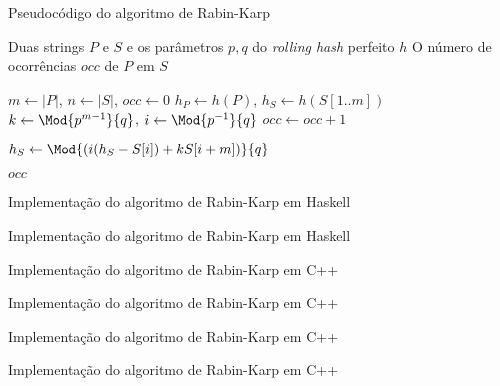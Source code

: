\begin{frame}[fragile]{Pseudocódigo do algoritmo de Rabin-Karp}

    \begin{algorithm}[H]
        \caption{Algoritmo de Rabin-Karp com \textit{hash} perfeito}
        \begin{algorithmic}[1]
            \Require Duas strings $P$ e $S$ e os parâmetros $p, q$ do \textit{rolling hash} perfeito $h$
            \Ensure O número de ocorrências $occ$ de $P$ em $S$

                \State $m \gets |P|$, $n \gets |S|$, $occ \gets 0$
                \State $h_P \gets h(P)$, $h_S \gets h(S[1..m])$
                \State $k \gets \Mod{p^{m - 1}}{q}$, $i \gets \Mod{p^{-1}}{q}$
                \State
                        \State $occ \gets occ + 1$
                    \EndIf

                        \State $h_S \gets \Mod{\left(i(h_S - S[i]) + kS[i + m]\right)}{q}$
                    \EndIf
                \EndFor

                \State \Return $occ$
            \EndFunction
        \end{algorithmic}
    \end{algorithm}

\end{frame}

\begin{frame}[fragile]{Implementação do algoritmo de Rabin-Karp em Haskell}
\end{frame}

\begin{frame}[fragile]{Implementação do algoritmo de Rabin-Karp em Haskell}
\end{frame}

\begin{frame}[fragile]{Implementação do algoritmo de Rabin-Karp em C++}
\end{frame}

\begin{frame}[fragile]{Implementação do algoritmo de Rabin-Karp em C++}
\end{frame}

\begin{frame}[fragile]{Implementação do algoritmo de Rabin-Karp em C++}
\end{frame}

\begin{frame}[fragile]{Implementação do algoritmo de Rabin-Karp em C++}
\end{frame}
